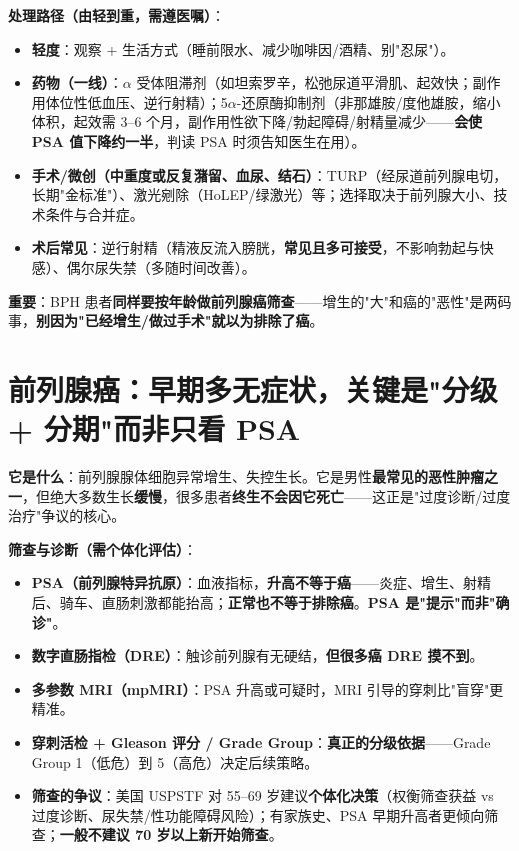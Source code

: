 \documentclass[12pt,UTF8,openany]{ctexbook}
\begin{document}
\textbf{处理路径（由轻到重，需遵医嘱）}：
\begin{itemize}[leftmargin=2em,itemsep=0.3em]
  \item \textbf{轻度}：观察 + 生活方式（睡前限水、减少咖啡因/酒精、别"忍尿"）。
  \item \textbf{药物（一线）}：$\alpha$ 受体阻滞剂（如坦索罗辛，松弛尿道平滑肌、起效快；副作用体位性低血压、逆行射精）；5$\alpha$-还原酶抑制剂（非那雄胺/度他雄胺，缩小体积，起效需 3--6 个月，副作用性欲下降/勃起障碍/射精量减少——\textbf{会使 PSA 值下降约一半}，判读 PSA 时须告知医生在用）。
  \item \textbf{手术/微创（中重度或反复潴留、血尿、结石）}：TURP（经尿道前列腺电切，长期"金标准"）、激光剜除（HoLEP/绿激光）等；选择取决于前列腺大小、技术条件与合并症。
  \item \textbf{术后常见}：逆行射精（精液反流入膀胱，\textbf{常见且多可接受}，不影响勃起与快感）、偶尔尿失禁（多随时间改善）。
\end{itemize}

\noindent\textbf{重要}：BPH 患者\textbf{同样要按年龄做前列腺癌筛查}——增生的"大"和癌的"恶性"是两码事，\textbf{别因为"已经增生/做过手术"就以为排除了癌}。

\section{前列腺癌：早期多无症状，关键是"分级 + 分期"而非只看 PSA}

\textbf{它是什么}：前列腺腺体细胞异常增生、失控生长。它是男性\textbf{最常见的恶性肿瘤之一}，但绝大多数生长\textbf{缓慢}，很多患者\textbf{终生不会因它死亡}——这正是"过度诊断/过度治疗"争议的核心。

\textbf{筛查与诊断（需个体化评估）}：
\begin{itemize}[leftmargin=2em,itemsep=0.3em]
  \item \textbf{PSA（前列腺特异抗原）}：血液指标，\textbf{升高不等于癌}——炎症、增生、射精后、骑车、直肠刺激都能抬高；\textbf{正常也不等于排除癌}。\textbf{PSA 是"提示"而非"确诊"}。
  \item \textbf{数字直肠指检（DRE）}：触诊前列腺有无硬结，\textbf{但很多癌 DRE 摸不到}。
  \item \textbf{多参数 MRI（mpMRI）}：PSA 升高或可疑时，MRI 引导的穿刺比"盲穿"更精准。
  \item \textbf{穿刺活检 + Gleason 评分 / Grade Group}：\textbf{真正的分级依据}——Grade Group 1（低危）到 5（高危）决定后续策略。
  \item \textbf{筛查的争议}：美国 USPSTF 对 55--69 岁建议\textbf{个体化决策}（权衡筛查获益 vs 过度诊断、尿失禁/性功能障碍风险）；有家族史、PSA 早期升高者更倾向筛查；\textbf{一般不建议 70 岁以上新开始筛查}。
\end{itemize}
\end{document}
